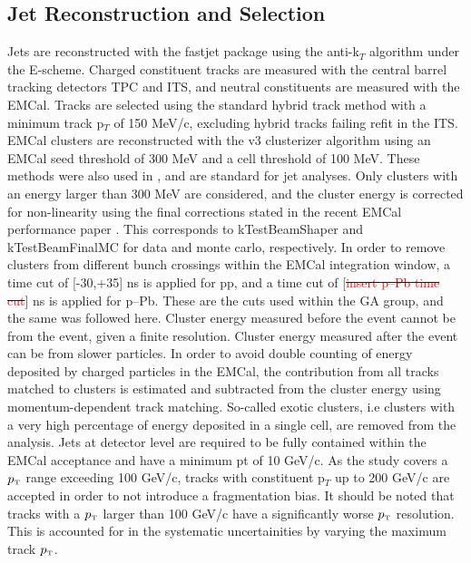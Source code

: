 \documentclass[ALICE]{ALICE_analysis_notes}
\newcommand{\pT}{$p_{\mbox{\tiny T}}$\xspace}
\newcommand{\pPb}{{\mbox{p--Pb}}\xspace}
\newcommand{\pp}{pp\xspace}
\providecommand{\DIFaddtex}[1]{{\protect\color{blue}\uwave{#1}}} %
\providecommand{\DIFdeltex}[1]{{\protect\color{red}\sout{#1}}}                      %
\providecommand{\DIFaddbegin}{} %
\providecommand{\DIFaddend}{} %
\providecommand{\DIFdelbegin}{} %
\providecommand{\DIFdelend}{} %
\providecommand{\DIFadd}[1]{\texorpdfstring{\DIFaddtex{#1}}{#1}} %
\providecommand{\DIFdel}[1]{\texorpdfstring{\DIFdeltex{#1}}{}} %
\newcommand{\DIFscaledelfig}{0.5}
\newlength{\DIFdelgraphicswidth} %
\newlength{\DIFdelgraphicsheight} %
\newcommand{\DIFaddincludegraphics}[2][]{{\color{blue}\fbox{\DIFOincludegraphics[#1]{#2}}}} %
\newcommand{\DIFdelincludegraphics}[2][]{%
\sbox{\DIFdelgraphicsbox}{\DIFOincludegraphics[#1]{#2}}%
\settoboxwidth{\DIFdelgraphicswidth}{\DIFdelgraphicsbox} %
\settoboxtotalheight{\DIFdelgraphicsheight}{\DIFdelgraphicsbox} %
\scalebox{\DIFscaledelfig}{%
\parbox[b]{\DIFdelgraphicswidth}{\usebox{\DIFdelgraphicsbox}\\[-\baselineskip] \rule{\DIFdelgraphicswidth}{0em}}\llap{\resizebox{\DIFdelgraphicswidth}{\DIFdelgraphicsheight}{%
\setlength{\unitlength}{\DIFdelgraphicswidth}%
\begin{picture}(1,1)%
\thicklines\linethickness{2pt} %
{\color[rgb]{1,0,0}\put(0,0){\framebox(1,1){}}}%
{\color[rgb]{1,0,0}\put(0,0){\line( 1,1){1}}}%
{\color[rgb]{1,0,0}\put(0,1){\line(1,-1){1}}}%
\end{picture}%
}\hspace*{3pt}}} %
} %
\DeclareRobustCommand{\DIFaddbegin}{\DIFOaddbegin \let\includegraphics\DIFaddincludegraphics} %
\DeclareRobustCommand{\DIFaddend}{\DIFOaddend \let\includegraphics\DIFOincludegraphics} %
\DeclareRobustCommand{\DIFdelbegin}{\DIFOdelbegin \let\includegraphics\DIFdelincludegraphics} %
\DeclareRobustCommand{\DIFdelend}{\DIFOaddend \let\includegraphics\DIFOincludegraphics} %
\begin{document}
\subsection{Jet Reconstruction and Selection}
\label{sec:JetRecoSel}

Jets are reconstructed with the fastjet package using the anti-k$_T$ algorithm under the E-scheme. Charged constituent tracks are measured with the central barrel tracking detectors TPC and ITS, and neutral constituents are measured with the EMCal. Tracks are selected using the standard hybrid track method with a minimum track p$_T$ of 150 MeV/c, excluding hybrid tracks failing refit in the ITS. EMCal clusters are reconstructed with the v3 clusterizer algorithm using an EMCal seed threshold of 300 MeV and a cell threshold of 100 MeV. These methods were also used in \cite{anaNoteMFasel}, and are standard for jet analyses. Only clusters with an energy larger than 300 MeV are considered, and the cluster energy is corrected for non-linearity using the final corrections stated in the recent EMCal performance paper \cite{EMCalPerformance2022}. This corresponds to kTestBeamShaper and kTestBeamFinalMC for data and monte carlo, respectively. In order to remove clusters from different bunch crossings within the EMCal integration window, a time cut of [-30,+35] ns is applied for \pp, and a time cut of [\DIFdelbegin \DIFdel{\textcolor{red}{insert \pPb time cut}}\DIFdelend \DIFaddbegin \DIFadd{-50,+50}\DIFaddend ] ns is applied for \pPb. These are the cuts used within the GA group, and the same was followed here. Cluster energy measured before the event cannot be from the event, given a finite resolution. Cluster energy measured after the event can be from slower particles. In order to avoid double counting of energy deposited by charged particles in the EMCal, the contribution from all tracks matched to clusters is estimated and subtracted from the cluster energy using momentum-dependent track matching. So-called exotic clusters, i.e clusters with a very high percentage of energy deposited in a single cell, are removed from the analysis. Jets at detector level are required to be fully contained within the EMCal acceptance and have a minimum pt of 10 GeV/c. As the study covers a \pT range exceeding 100 GeV/c, tracks with constituent p$_T$ up to 200 GeV/c are accepted in order to not introduce a fragmentation bias. It should be noted that tracks with a \pT larger than 100 GeV/c have a significantly worse \pT resolution. This is accounted for in the systematic uncertainities by varying the maximum track \pT.
\end{document}
